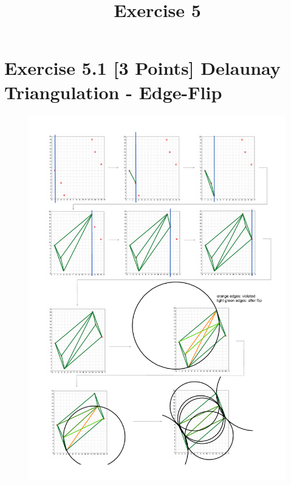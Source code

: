 \documentclass[a4paper]{article}
\date{}
\author{}
\title{Exercise 5}
\begin{document}
\maketitle 
\thispagestyle{fancy}



\section*{Exercise 5.1 [3 Points] Delaunay Triangulation - Edge-Flip}

\begin{figure}[h!]
	\centering
	\includegraphics[width=0.79\linewidth]{delaunay.pdf}
	\label{fig:delaunay}
\end{figure}

\clearpage
\end{document}
